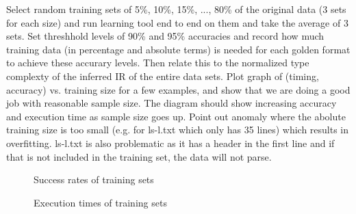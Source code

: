 Select random training sets of 5\%, 10\%, 15\%, ..., 80\% of 
the original data (3 sets for each size) and run learning tool end to end on 
them and take the average of 3 sets. 
Set threshhold levels of 90\% and 95\% accuracies and record how much training data (in percentage and
absolute terms) is needed for each golden format to achieve these accurary levels. Then relate this
to the normalized type complexty of the inferred IR of the entire data sets.
Plot graph of (timing, accuracy) vs. training size 
for a few examples, and show that we are doing a good job with reasonable sample size. The diagram should
show increasing accuracy and execution time as sample size goes up. Point out anomaly
where the abolute training size is too small (e.g. for ls-l.txt which only has 35 lines) which results
in overfitting. ls-l.txt is also problematic as it has a header in the first line and if that is not included
in the training set, the data will not parse.

\begin{figure}
\caption{Success rates of training sets}
\end{figure}

\begin{figure}
\caption{Execution times of training sets}
\end{figure}

